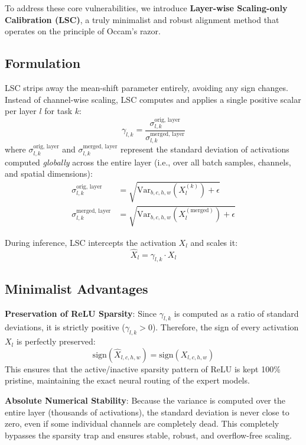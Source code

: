\documentclass{article}
\theoremstyle{plain}
\theoremstyle{definition}
\theoremstyle{remark}
\begin{document}
To address these core vulnerabilities, we introduce \textbf{Layer-wise Scaling-only Calibration (LSC)}, a truly minimalist and robust alignment method that operates on the principle of Occam's razor.

\subsection{Formulation}
LSC strips away the mean-shift parameter entirely, avoiding any sign changes. Instead of channel-wise scaling, LSC computes and applies a single positive scalar per layer $l$ for task $k$:
\begin{equation}
    \gamma_{l,k} = \frac{\sigma_{l,k}^{\text{orig, layer}}}{\sigma_{l,k}^{\text{merged, layer}}}
\end{equation}
where $\sigma_{l,k}^{\text{orig, layer}}$ and $\sigma_{l,k}^{\text{merged, layer}}$ represent the standard deviation of activations computed \textit{globally} across the entire layer (i.e., over all batch samples, channels, and spatial dimensions):
\begin{align}
    \sigma_{l,k}^{\text{orig, layer}} &= \sqrt{\text{Var}_{b, c, h, w}(X_{l}^{(k)}) + \epsilon} \\
    \sigma_{l,k}^{\text{merged, layer}} &= \sqrt{\text{Var}_{b, c, h, w}(X_{l}^{(\text{merged})}) + \epsilon}
\end{align}

During inference, LSC intercepts the activation $X_l$ and scales it:
\begin{equation}
    \hat{X}_l = \gamma_{l,k} \cdot X_l
\end{equation}

\subsection{Minimalist Advantages}
\textbf{Preservation of ReLU Sparsity}: Since $\gamma_{l,k}$ is computed as a ratio of standard deviations, it is strictly positive ($\gamma_{l,k} > 0$). Therefore, the sign of every activation $X_l$ is perfectly preserved:
\begin{equation}
    \text{sign}(\hat{X}_{l, c, h, w}) = \text{sign}(X_{l, c, h, w})
\end{equation}
This ensures that the active/inactive sparsity pattern of ReLU is kept 100\% pristine, maintaining the exact neural routing of the expert models.

\textbf{Absolute Numerical Stability}: Because the variance is computed over the entire layer (thousands of activations), the standard deviation is never close to zero, even if some individual channels are completely dead. This completely bypasses the sparsity trap and ensures stable, robust, and overflow-free scaling.
\end{document}
